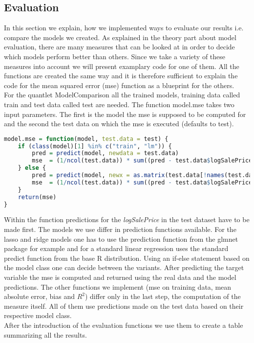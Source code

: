 \subsection{Evaluation}
In this section we explain, how we implemented ways to evaluate our results i.e. compare the models we created. As explained in the theory part about model evaluation, there are many measures that can be looked at in order to decide which models perform better than others. Since we take a variety of these measures into account we will present examplary code for one of them. All the functions are created the same way and it is therefore sufficient to explain the code for the mean squared error (mse) function as a blueprint for the others. \\
For the quantlet ModelComparison all the trained models, training data called train and test data called test are needed. The function model.mse takes two input parameters. The first is the model the mse is supposed to be computed for and the second the test data on which the mse is executed (defaults to test). 
\begin{lstlisting}[language=R]
model.mse = function(model, test.data = test) {
    if (class(model)[1] %in% c("train", "lm")) {
        pred = predict(model, newdata = test.data)
        mse  = (1/ncol(test.data)) * sum((pred - test.data$logSalePrice)^2)
    } else {
        pred = predict(model, newx = as.matrix(test.data[!names(test.data) %in% "logSalePrice"]), s = "lambda.1se")
        mse  = (1/ncol(test.data)) * sum((pred - test.data$logSalePrice)^2)
    }
    return(mse)
}
\end{lstlisting}
Within the function predictions for the \textit{logSalePrice} in the test dataset have to be made first. The models we use differ in prediction functions available. For the lasso and ridge models one has to use the prediction function from the glmnet package for example and for a standard linear regression uses the standard predict  function from the base R distribution. Using an if-else statement based on the model class one can decide between the variants. After predicting the target variable the mse is computed and returned using the real data and the model predictions. The other functions we implement (mse on training data, mean absolute error, bias and $R^2$) differ only in the last step, the computation of the measure itself. All of them use predictions made on the test data based on their respective model class. \\
After the introduction of the evaluation functions we use them to create a table summarizing all the results.
